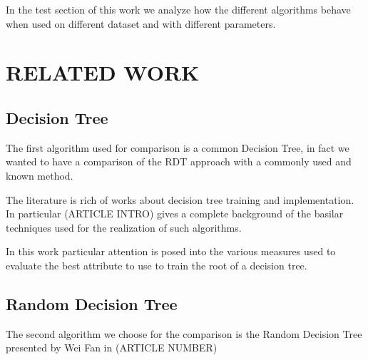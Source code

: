 \documentclass{acm_proc_article-sp-sigmod07}
\begin{document}
In the test section of this work we analyze how the different algorithms
behave when used on different dataset and with different parameters. 

\section{RELATED WORK}


\subsection{Decision Tree}
The first algorithm used for comparison is a common Decision Tree, in fact
we wanted to have a comparison of the RDT approach with a commonly used
and known method.

The literature is rich of works about decision tree training and
implementation. In particular (ARTICLE INTRO) gives a complete background
of the basilar techniques used for the realization of such algorithms.

In this work particular attention is posed into the various measures used
to evaluate the best attribute to use to train the root of a decision
tree.


\subsection{Random Decision Tree}
The second algorithm we choose for the comparison is the Random Decision
Tree presented by Wei Fan in (ARTICLE NUMBER)
\end{document}
